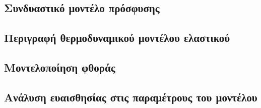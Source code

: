 \subsection{Συνδυαστικό μοντέλο πρόσφυσης}


\subsection{Περιγραφή θερμοδυναμικού μοντέλου ελαστικού}


\subsection{Μοντελοποίηση φθοράς}


\subsection{Ανάλυση ευαισθησίας στις παραμέτρους του μοντέλου}
